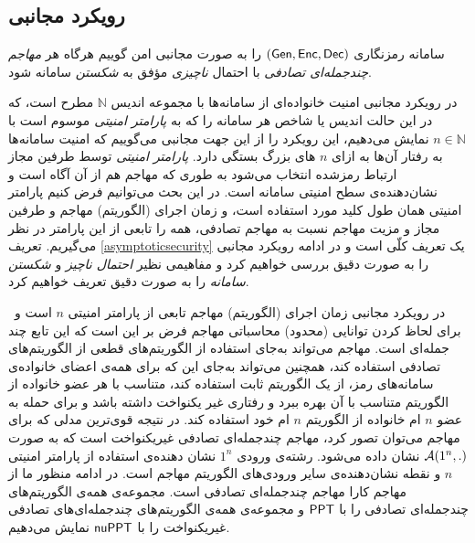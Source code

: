 \subsection*{رویکرد مجانبی}
\begin{definition}
	\label{asymptoticsecurity}
	\cite{katz2014introduction}
	سامانه رمزنگاری 
	$(\mathsf{Gen}, \mathsf{Enc}, \mathsf{Dec})$
	 را به صورت مجانبی امن گوییم هر‌گاه هر 
	 \textit{مهاجم چندجمله‌ای تصادفی}
	 با احتمال 
	 \textit{ناچیزی}
	 مؤفق به 
	 \textit{شکستن}
	  سامانه شود.
\end{definition}
در رویکرد مجانبی امنیت خانواده‌ای از سامانه‌ها با مجموعه‌  اندیس 
$\mathbb{N}$
مطرح است،  که در این حالت اندیس یا شاخص هر سامانه را که به
\textit{ پارامتر امنیتی \textit{}}
 موسوم است با 
{\small }$n\in\mathbb{N}$
نمایش می‌دهیم، این رویکرد را از این جهت مجانبی می‌گوییم که امنیت سامانه‌ها به رفتار آن‌ها به ازای 
$n$
های بزرگ بستگی دارد. 
\textit{پارامتر امنیتی }
 توسط طرفین مجاز ارتباط رمزشده انتخاب می‌شود به طوری که مهاجم هم از آن آگاه است و نشان‌دهنده‌ی سطح امنیتی سامانه است. در این بحث می‌توانیم فرض کنیم پارامتر امنیتی همان طول کلید مورد استفاده است، و زمان اجرای (الگوریتم) مهاجم و طرفین مجاز و مزیت مهاجم نسبت به مهاجم تصادفی، همه را تابعی از این پارامتر در نظر می‌گیریم. تعریف 
 \ref{asymptoticsecurity}
  یک تعریف کلّی است و در ادامه رویکرد مجانبی را به صورت دقیق بررسی خواهیم کرد و مفاهیمی نظیر
  \textit{احتمال ناچیز}
  و 
  \textit{شکستن سامانه }
  را به صورت دقیق تعریف خواهیم کرد.
 
 \begin{definition} \ 
 	در رویکرد مجانبی زمان اجرای (الگوریتم) مهاجم تابعی از پارامتر امنیتی 
 	$n$
 	 است و برای لحاظ کردن توانایی (محدود) محاسباتی مهاجم فرض بر این است که این تابع چند جمله‌ای است. مهاجم می‌تواند به‌جای استفاده از الگوریتم‌های قطعی از الگوریتم‌های تصادفی استفاده کند، همچنین می‌تواند به‌جای این که برای همه‌ی اعضای خانواده‌ی سامانه‌های رمز، از یک الگوریتم ثابت استفاده کند، متناسب با هر عضو خانواده از الگوریتم متناسب با آن بهره ببرد و رفتاری غیر یکنواخت داشته باشد و برای حمله به عضو 
 	 $n$
 	 ام خانواده از الگوریتم 
 	 $n$
 	 ام خود استفاده کند. در نتیجه قوی‌ترین مدلی که برای مهاجم می‌توان تصور کرد، مهاجم چندجمله‌ای تصادفی غیریکنواخت
است که به صورت 
$\mathcal{A}(1^{n}, .)$
نشان داده می‌شود. رشته‌ی ورودی 
$1^{n}$
نشان دهنده‌ی استفاده از پارامتر امنیتی 
$n$
 و نقطه نشان‌دهنده‌ی سایر ورودی‌‌های الگوریتم مهاجم است. در ادامه منظور ما از مهاجم کارا مهاجم چندجمله‌ای تصادفی است. مجموعه‌ی همه‌ی الگوریتم‌های چندجمله‌ای تصادفی را با 
 $\mathsf{PPT}$
 و مجموعه‌ی همه‌ی الگوریتم‌های چندجمله‌ای‌های تصادفی غیریکنواخت را با 
 $\mathsf{nuPPT}$
 نمایش می‌دهیم.
 \end{definition}
 
